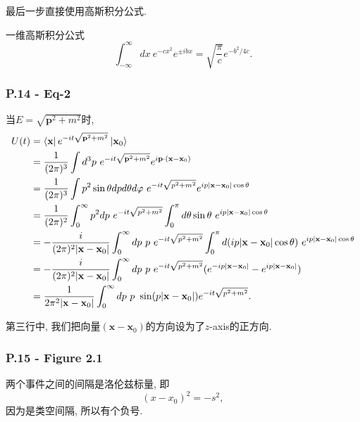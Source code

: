 \documentclass[cn,hazy,green,11pt,device=normal,chinesefont=founder]{elegantnote}
\begin{document}
最后一步直接使用高斯积分公式. 

\begin{note}
一维高斯积分公式
\begin{equation}
\int_{-\infty}^{\infty}dx\ e^{-cx^2}e^{\pm ibx} = \sqrt{\frac{\pi}{c}}e^{-b^2/4c}. 
\end{equation}
\end{note}

\subsubsection{P.14​ - Eq-2}

当$E = \sqrt{\mathbf{p}^2+m^2}$时, 
\begin{equation}
  \begin{aligned}
  U(t) &= \mathinner{\langle \mathbf{x}|}e^{-it\sqrt{\mathbf{p}^2+m^2}}\mathinner{|\mathbf{x}_0\rangle} \\
       &= \frac{1}{(2\pi)^3} \int d^3p \ e^{-it\sqrt{\mathbf{p}^2+m^2}} e^{i\mathbf{p}\cdot(\mathbf{x}-\mathbf{x}_0)} \\ 
       &= \frac{1}{(2\pi)^3} \int p^2\sin\theta dp d\theta d\varphi \ e^{-it\sqrt{p^2+m^2}} e^{ip|\mathbf{x}-\mathbf{x}_0|\cos\theta} \\ 
       &= \frac{1}{(2\pi)^2} \int_0^\infty p^2 dp \ e^{-it\sqrt{p^2+m^2}} \int_0^\pi d\theta \sin\theta \ e^{ip|\mathbf{x}-\mathbf{x}_0|\cos\theta} \\
       &= -\frac{i}{(2\pi)^2|\mathbf{x}-\mathbf{x}_0|} \int_0^\infty dp \ p\ e^{-it\sqrt{p^2+m^2}} \int_0^\pi d(ip|\mathbf{x}-\mathbf{x}_0|\cos\theta) \ e^{ip|\mathbf{x}-\mathbf{x}_0|\cos\theta} \\
       &= -\frac{i}{(2\pi)^2|\mathbf{x}-\mathbf{x}_0|} \int_0^\infty dp \ p\ e^{-it\sqrt{p^2+m^2}} (e^{-ip|\mathbf{x}-\mathbf{x}_0|}-e^{ip|\mathbf{x}-\mathbf{x}_0|}) \\
       &= \frac{1}{2\pi^2|\mathbf{x}-\mathbf{x}_0|} \int_0^\infty dp \ p\ \sin(p|\mathbf{x}-\mathbf{x}_0|) e^{-it\sqrt{p^2+m^2}}. 
  \end{aligned}
\end{equation}

第三行中, 我们把向量$(\mathbf{x}-\mathbf{x}_0)$的方向设为了$z$-axis的正方向. 

\subsubsection{P.15 - Figure 2.1}

两个事件之间的间隔是洛伦兹标量, 即
\begin{equation}
  (x-x_0)^2 = -s^2,
\end{equation}
因为是类空间隔, 所以有个负号. 
\end{document}
